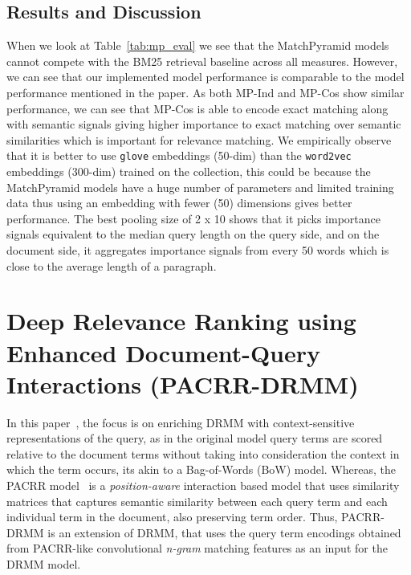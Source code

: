 \subsection{Results and Discussion}
When we look at Table~\ref{tab:mp_eval} we see that the MatchPyramid models cannot compete with the BM25 retrieval baseline across all measures. However, we can see that our implemented model performance is comparable to the model performance mentioned in the paper. As both MP-Ind and MP-Cos show similar performance, we can see that MP-Cos is able to encode exact matching along with semantic signals giving higher importance to exact matching over semantic similarities which is important for relevance matching. We empirically observe that it is better to use \texttt{glove} embeddings (50-dim) than the \texttt{word2vec} embeddings (300-dim) trained on the collection, this could be because the MatchPyramid models have a huge number of parameters and limited training data thus using an embedding with fewer (50) dimensions gives better performance. The best pooling size of 2 x 10 shows that it picks importance signals equivalent to the median query length on the query side, and on the document side, it aggregates importance signals from every 50 words which is close to the average length of a paragraph.

\section{Deep Relevance Ranking using Enhanced Document-Query Interactions (PACRR-DRMM)}

In this paper~\citep{pacrr_drmm_18}, the focus is on enriching DRMM with context-sensitive representations of the query, as in the original model query terms are scored relative to the document terms without taking into consideration the context in which the term occurs, its akin to a Bag-of-Words (BoW) model. Whereas, the 
PACRR model~\citep{pacrr17,Yates17} is a \textit{position-aware} interaction based model that uses similarity matrices that captures semantic similarity between each query term and each individual term in the document, also preserving term order. Thus, PACRR-DRMM is an extension of DRMM, that uses the query term encodings obtained from PACRR-like convolutional \textit{n-gram} matching features as an input for the  DRMM model.

